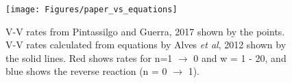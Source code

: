 \documentclass[11pt, oneside]{article}   	%
\begin{document}
\begin{figure}
\centering
\texttt{[image: Figures/paper\_vs\_equations]}
\caption{V-V rates from Pintassilgo and Guerra, 2017 \cite{Pintassilgo2017modelling} shown by the points. V-V rates calculated from equations by Alves \textit{et al}, 2012 \cite{Alves2012capacitively} shown by the solid lines. Red shows rates for n=1 $\rightarrow$ 0 and w = 1 - 20, and blue shows the reverse reaction (n = 0 $\rightarrow$ 1).}
\label{fig:paper_vs_equations}
\end{figure}

%
%
%

%
%
\end{document}
